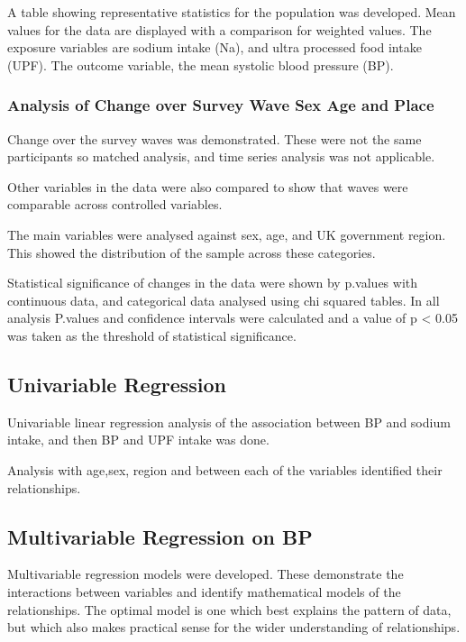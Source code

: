 \documentclass[
]{article}
\begin{document}
A table showing representative statistics for the population was
developed. Mean values for the data are displayed with a comparison for
weighted values. The exposure variables are sodium intake (Na), and
ultra processed food intake (UPF). The outcome variable, the mean
systolic blood pressure (BP).

\hypertarget{analysis-of-change-over-survey-wave-sex-age-and-place}{%
\subsubsection{Analysis of Change over Survey Wave Sex Age and
Place}\label{analysis-of-change-over-survey-wave-sex-age-and-place}}

Change over the survey waves was demonstrated. These were not the same
participants so matched analysis, and time series analysis was not
applicable.

Other variables in the data were also compared to show that waves were
comparable across controlled variables.

The main variables were analysed against sex, age, and UK government
region. This showed the distribution of the sample across these
categories.

Statistical significance of changes in the data were shown by p.values
with continuous data, and categorical data analysed using chi squared
tables. In all analysis P.values and confidence intervals were
calculated and a value of p \textless{} 0.05 was taken as the threshold
of statistical significance.

\hypertarget{univariable-regression}{%
\subsection{Univariable Regression}\label{univariable-regression}}

Univariable linear regression analysis of the association between BP and
sodium intake, and then BP and UPF intake was done.

Analysis with age,sex, region and between each of the variables
identified their relationships.

\hypertarget{multivariable-regression-on-bp}{%
\subsection{Multivariable Regression on
BP}\label{multivariable-regression-on-bp}}

Multivariable regression models were developed. These demonstrate the
interactions between variables and identify mathematical models of the
relationships. The optimal model is one which best explains the pattern
of data, but which also makes practical sense for the wider
understanding of relationships.
\end{document}
